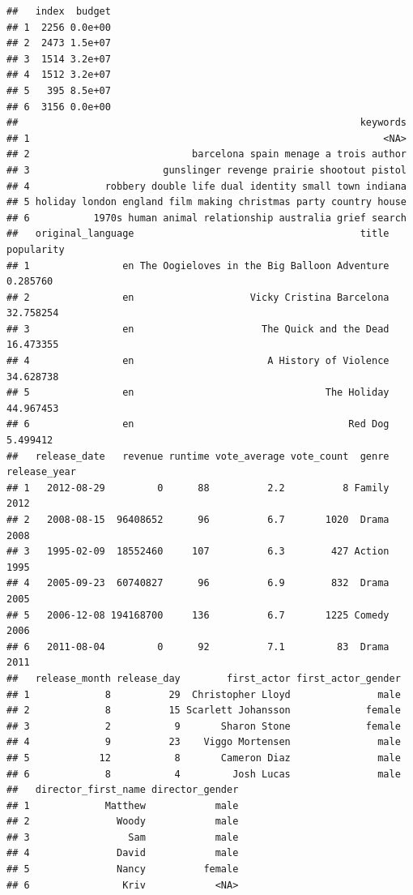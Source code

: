 \documentclass[
]{article}
\begin{document}
\begin{verbatim}
##   index  budget
## 1  2256 0.0e+00
## 2  2473 1.5e+07
## 3  1514 3.2e+07
## 4  1512 3.2e+07
## 5   395 8.5e+07
## 6  3156 0.0e+00
##                                                           keywords
## 1                                                             <NA>
## 2                            barcelona spain menage a trois author
## 3                       gunslinger revenge prairie shootout pistol
## 4             robbery double life dual identity small town indiana
## 5 holiday london england film making christmas party country house
## 6           1970s human animal relationship australia grief search
##   original_language                                       title popularity
## 1                en The Oogieloves in the Big Balloon Adventure   0.285760
## 2                en                    Vicky Cristina Barcelona  32.758254
## 3                en                      The Quick and the Dead  16.473355
## 4                en                       A History of Violence  34.628738
## 5                en                                 The Holiday  44.967453
## 6                en                                     Red Dog   5.499412
##   release_date   revenue runtime vote_average vote_count  genre release_year
## 1   2012-08-29         0      88          2.2          8 Family         2012
## 2   2008-08-15  96408652      96          6.7       1020  Drama         2008
## 3   1995-02-09  18552460     107          6.3        427 Action         1995
## 4   2005-09-23  60740827      96          6.9        832  Drama         2005
## 5   2006-12-08 194168700     136          6.7       1225 Comedy         2006
## 6   2011-08-04         0      92          7.1         83  Drama         2011
##   release_month release_day        first_actor first_actor_gender
## 1             8          29  Christopher Lloyd               male
## 2             8          15 Scarlett Johansson             female
## 3             2           9       Sharon Stone             female
## 4             9          23    Viggo Mortensen               male
## 5            12           8       Cameron Diaz               male
## 6             8           4         Josh Lucas               male
##   director_first_name director_gender
## 1             Matthew            male
## 2               Woody            male
## 3                 Sam            male
## 4               David            male
## 5               Nancy          female
## 6                Kriv            <NA>
\end{verbatim}
\end{document}
